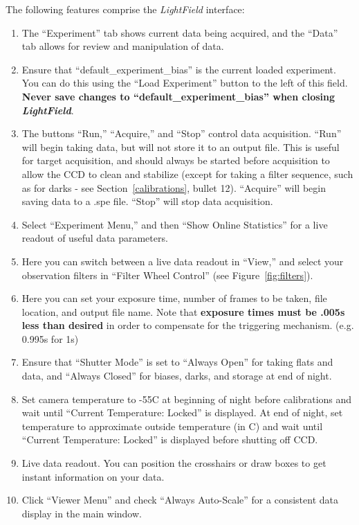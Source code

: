 \documentclass[12pt]{article}
\begin{document}
\noindent The following features comprise the \textit{LightField} interface:
\begin{enumerate}
   \item The ``Experiment'' tab shows current data being acquired, and the ``Data'' tab allows for review and manipulation of data.
   \item Ensure that ``default\_experiment\_bias'' is the current loaded experiment. You can do this using the ``Load Experiment'' button to the left of this field. \textbf{Never save changes to ``default\_experiment\_bias'' when closing \textit{LightField}}.
   \item The buttons ``Run,'' ``Acquire,'' and ``Stop'' control data acquisition. ``Run'' will begin taking data, but will not store it to an output file. This is useful for target acquisition, and should always be started before acquisition to allow the CCD to clean and stabilize (except for taking a filter sequence, such as for darks - see Section~\ref{calibrations}, bullet 12). ``Acquire'' will begin saving data to a .spe file. ``Stop'' will stop data acquisition.
   \item Select ``Experiment Menu,'' and then ``Show Online Statistics'' for a live readout of useful data parameters.
   \item Here you can switch between a live data readout in ``View,'' and select your observation filters in ``Filter Wheel Control'' (see Figure~\ref{fig:filters}).
   \item Here you can set your exposure time, number of frames to be taken, file location, and output file name. Note that \textbf{exposure times must be .005s less than desired} in order to compensate for the triggering mechanism. (e.g. 0.995s for 1s)
   \item Ensure that ``Shutter Mode'' is set to ``Always Open'' for taking flats and data, and ``Always Closed'' for biases, darks, and storage at end of night.
   \item Set camera temperature to -55\textdegree C at beginning of night before calibrations and wait until ``Current Temperature: Locked'' is displayed. At end of night, set temperature to approximate outside temperature (in \textdegree C) and wait until ``Current Temperature: Locked'' is displayed before shutting off CCD.
   \item Live data readout. You can position the crosshairs or draw boxes to get instant information on your data.
   \item Click ``Viewer Menu'' and check ``Always Auto-Scale'' for a consistent data display in the main window.
\end{enumerate}
\end{document}
